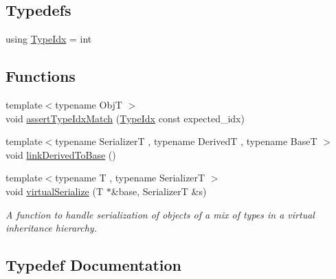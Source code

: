 \subsection*{Typedefs}
\begin{DoxyCompactItemize}
\item 
using \hyperlink{namespacecheckpoint_1_1dispatch_1_1vrt_acd3f9e6b091bcfbc23dc35ea8ef45d3b}{Type\+Idx} = int
\end{DoxyCompactItemize}
\subsection*{Functions}
\begin{DoxyCompactItemize}
\item 
{\footnotesize template$<$typename ObjT $>$ }\\void \hyperlink{namespacecheckpoint_1_1dispatch_1_1vrt_a1edd0d1d99a9d53058715b72e8aa7f38}{assert\+Type\+Idx\+Match} (\hyperlink{namespacecheckpoint_1_1dispatch_1_1vrt_acd3f9e6b091bcfbc23dc35ea8ef45d3b}{Type\+Idx} const expected\+\_\+idx)
\item 
{\footnotesize template$<$typename SerializerT , typename DerivedT , typename BaseT $>$ }\\void \hyperlink{namespacecheckpoint_1_1dispatch_1_1vrt_a386bc0347756889ae1d3849cf351110e}{link\+Derived\+To\+Base} ()
\item 
{\footnotesize template$<$typename T , typename SerializerT $>$ }\\void \hyperlink{namespacecheckpoint_1_1dispatch_1_1vrt_ab62fa4e32b27853f6b57caf24b6a77cc}{virtual\+Serialize} (T $\ast$\&base, SerializerT \&s)
\begin{DoxyCompactList}\small\item\em A function to handle serialization of objects of a mix of types in a virtual inheritance hierarchy. \end{DoxyCompactList}\end{DoxyCompactItemize}


\subsection{Typedef Documentation}
\mbox{\label{namespacecheckpoint_1_1dispatch_1_1vrt_acd3f9e6b091bcfbc23dc35ea8ef45d3b}} 
